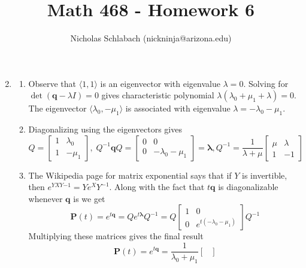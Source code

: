 \documentclass[14pt,letterpaper]{extarticle}
\title{Math 468 - Homework 6}
\author{Nicholas Schlabach (nickninja@arizona.edu)}
\date{\DTMUsedate{titledate}}
\newcommand*{\bP}{\mathbf{P}}
\newcommand*{\bq}{\mathbf{q}}
\begin{document}
\pagestyle{fancy}
\fancyhead[C]{\hspace{5mm}\Big(\thetitle{}\Big)}
\fancyfoot{} %
\maketitle
\thispagestyle{fancy}


\begin{center}
\begin{enumerate}
\setcounter{enumi}{1}
\item
    \begin{enumerate}
    \item
        Observe that $\langle1,1\rangle$ is an eigenvector with eigenvalue $\lambda=0$.
        Solving for $\det( \bq-\lambda I)=0$ gives characteristic polynomial $\lambda(\lambda_0+\mu_1+\lambda)=0$.
        The eigenvector $\langle \lambda_0,-\mu_1\rangle$ is associated with eigenvalue $\lambda=-\lambda_0-\mu_1$.
    \item
        Diagonalizing using the eigenvectors gives 
        \[ Q=\begin{bmatrix}
            1 & \lambda_0 \\
            1 & -\mu_1
        \end{bmatrix}, \; Q^{-1}\bq
            Q=\begin{bmatrix}
            0 & 0 \\
            0 & -\lambda_0-\mu_1
        \end{bmatrix}=\boldsymbol{\lambda}, Q^{-1}=\frac{1}{\lambda+\mu}\begin{bmatrix}
                \mu & \lambda \\
                1 & -1
        \end{bmatrix} \]
        \item The Wikipedia page for matrix exponential says that if $Y$ is invertible, then $e^{YXY{-1}}=Ye^XY^{-1}$. Along with the fact that $t\bq$ is diagonalizable whenever $\bq$ is we get
        \[ \bP(t)=e^{t\bq}=Qe^{t\boldsymbol{\lambda}}Q^{-1}=Q\begin{bmatrix}
            1 & 0 \\
            0 & e^{t(-\lambda_0-\mu_1)}       \end{bmatrix}Q^{-1} \]
        Multiplying these matrices gives the final result
        \[ \bP(t)=e^{t\bq}=\frac{1}{\lambda_0+\mu_1}\begin{bmatrix}

\end{bmatrix}\]
\end{enumerate}
\end{enumerate}
\end{center}
\end{document}
